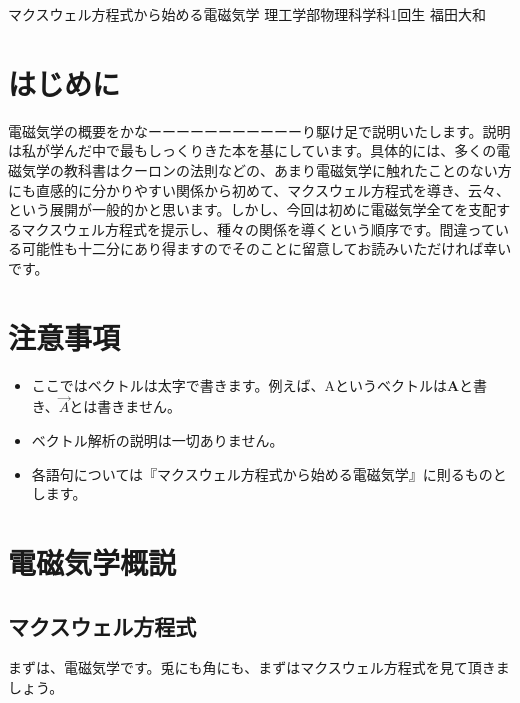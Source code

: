 \documentclass[10pt,b5paper,papersize,dvipdfmx]{jsbook}
\begin{document}

\kaishititle%
  {マクスウェル方程式から始める電磁気学}%
  {理工学部物理科学科1回生}%
  {福田大和}%


\section*{はじめに}
電磁気学の概要をかなーーーーーーーーーーーり駆け足で説明いたします。説明は私が学んだ中で最もしっくりきた本を基にしています。具体的には、多くの電磁気学の教科書はクーロンの法則などの、あまり電磁気学に触れたことのない方にも直感的に分かりやすい関係から初めて、マクスウェル方程式を導き、云々、という展開が一般的かと思います。しかし、今回は初めに電磁気学全てを支配するマクスウェル方程式を提示し、種々の関係を導くという順序です。間違っている可能性も十二分にあり得ますのでそのことに留意してお読みいただければ幸いです。

\section{注意事項}
\begin{itemize}
\item ここではベクトルは太字で書きます。例えば、Aというベクトルは$\mathbf{A}$と書き、$\vec{A}$とは書きません。
\item ベクトル解析の説明は一切ありません。
\item 各語句については『マクスウェル方程式から始める電磁気学』に則るものとします。
\end{itemize}

\section{電磁気学概説}
\subsection{マクスウェル方程式}
まずは、電磁気学です。兎にも角にも、まずはマクスウェル方程式を見て頂きましょう。
\end{document}
